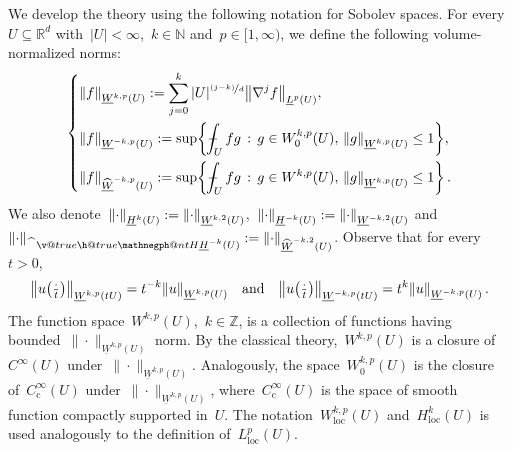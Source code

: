 \documentclass[11pt,twoside]{article} %
\makeatletter
\numberwithin{equation}{section}
\theoremstyle{definition}
\let\originalleft\left
\let\originalright\right
\renewcommand{\left}{\mathopen{}\mathclose\bgroup\originalleft}
\renewcommand{\right}{\aftergroup\egroup\originalright}
\newcommand*{\N}{\ensuremath{\mathbb{N}}}
\newcommand*{\Z}{\ensuremath{\mathbb{Z}}}
\newcommand*{\Rd}{\ensuremath{\mathbb{R}^d}}
\renewcommand*{\hat}{\widehat}
\newcommand{\qand}{\quad \mbox{and} \quad }
\def\Xint#1{\mathchoice
{\XXint\displaystyle\textstyle{#1}}%
{\XXint\textstyle\scriptstyle{#1}}%
{\XXint\scriptstyle\scriptscriptstyle{#1}}%
{\XXint\scriptscriptstyle\scriptscriptstyle{#1}}%
\!\int}
\def\XXint#1#2#3{{\setbox0=\hbox{$#1{#2#3}{\int}$}
\vcenter{\hbox{$#2#3$}}\kern-.5\wd0}}
\def\fint{\Xint-}
\newcommand{\negphantom}{\v@true\h@true\negph@nt}
\newcommand{\negph@nt}{\ifmmode\expandafter\mathpalette 
  \expandafter\mathnegph@nt\else\expandafter\makenegph@nt\fi}
\newcommand{\makenegph@nt}[1]{%
  \setbox\z@\hbox{\color@begingroup#1\color@endgroup}\finnegph@nt}
\newcommand{\finnegph@nt}{%
  \setbox\tw@\null 
  \ifv@ \ht\tw@\ht\z@\dp\tw@\dp\z@\fi \ifh@\wd\tw@-\wd\z@\fi\box\tw@}
\newcommand{\mathnegph@nt}[2]{%
  \setbox\z@\hbox{$\m@th #1{#2}$}\finnegph@nt}
\newcommand{\Hminusulk}{\hat{\phantom{H}}\negphantom{H}\underline{H}^{-k}}
\makeatother
\begin{document}
We develop the theory using the following notation for Sobolev spaces. For every~$U\subseteq\Rd$ with~$|U|<\infty$,~$k\in\N$ and~$p\in [1,\infty)$, we define the following volume-normalized norms:
\begin{equation}
\label{e.underlinednorms}
\left\{ 
\begin{aligned}
&
\left\| f \right\|_{\underline{W}^{k,p}(U)} 
:=
\sum_{j=0}^k
|U|^{\nicefrac {(j{-}k)}d} \left\| \nabla^j f \right\|_{\underline{L}^p(U)},
\\ & 
\left\| f \right\|_{\underline{W}^{-k,p}(U)} 
:=
\sup\left\{ 
\fint_U fg \,:\, 
g\in W^{k,p}_0(U), \, 
\left\| g \right\|_{\underline{W}^{k,p}(U)} 
\leq 1 \right\}, 
\\ & 
\left\| f \right\|_{\hat{\underline{W}}^{-k,p}(U)} 
:=
\sup\left\{ 
\fint_U fg \,:\, 
g\in W^{k,p}(U), \, 
\left\| g \right\|_{\underline{W}^{k,p}(U)} 
\leq 1 \right\} \,.
\end{aligned}
\right.
\end{equation}
We also denote~$\left\| \cdot \right\|_{\underline{H}^k(U)}:= \left\| \cdot \right\|_{\underline{W}^{k,2}(U)}$,~$\left\| \cdot \right\|_{\underline{H}^{-k}(U)}:= \left\| \cdot \right\|_{\underline{W}^{-k,2}(U)}$ and~$\left\| \cdot \right\|_{\Hminusulk(U)}:= \left\| \cdot \right\|_{\hat{\underline{W}}^{-k,2}(U)}$.
Observe that for every~$t>0$, 
\begin{equation} 
\label{e.Sobolev.scaling} 
\left\| u\left( \tfrac{\cdot}{t} \right) \right\|_{\underline{W}^{k,p}(t U)}  
= t^{-k} \left\| u \right\|_{\underline{W}^{k,p}(U)} 
\qand
\left\| u \left( \tfrac{\cdot}{t} \right) \right\|_{\underline{W}^{-k,p}(t U)} = t^{k} \left\| u  \right\|_{\underline{W}^{-k,p}(U)}
\,.
\end{equation}
The function space~$W^{k,p}(U)$,~$k\in \Z$, is a collection of functions having bounded~$\| \cdot\|_{\underline{W}^{k,p}(U)}$ norm. By the classical theory,~$W^{k,p}(U)$ is a closure of~$C^\infty(U)$ under~$\| \cdot\|_{\underline{W}^{k,p}(U)}$. Analogously, the space~$W_0^{k,p}(U)$ is the closure of~$C_{\mathrm{c}}^\infty(U)$ under~$\| \cdot\|_{\underline{W}^{k,p}(U)}$, where~$C_{\mathrm{c}}^\infty(U)$ is the space of smooth function compactly supported in~$U$. 
The notation~$W^{k,p}_{\mathrm{loc}}(U)$ and~$H^{k}_{\mathrm{loc}}(U)$ is used analogously to the definition of~$L^p_{\mathrm{loc}}(U)$.  

\smallskip
\end{document}
